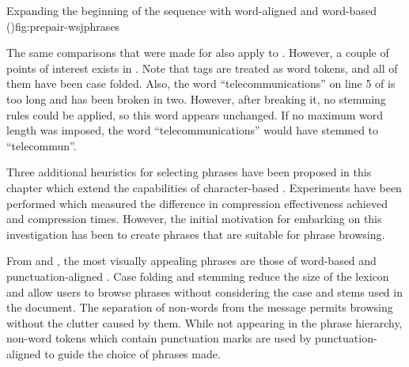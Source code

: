 {Expanding the beginning of the sequence with
word-aligned and word-based \repair (\wsja)}{fig:prepair-wsjphrases}

The same comparisons that were made for 
 also apply to 
.  However, a couple of 
points of interest exists in 
.  Note that \sgml
tags are treated as word tokens, and all of them have been
case folded.  Also, the word
``telecommunications'' on line 5 of 
 is too
long and has been broken in two.  However, after breaking
it, no stemming rules could be applied, so this word
appears unchanged.  If no maximum word length was imposed,
the word ``telecommunications'' would have stemmed to
``telecommun''.  


Three additional heuristics for selecting phrases
have been proposed in this chapter which extend the
capabilities of character-based \repair.
Experiments have been performed
which measured the difference in compression
effectiveness achieved and compression times.
However, the initial motivation
for embarking on this investigation has been to create
phrases that are suitable for phrase browsing.

From  and 
, the most visually
appealing phrases are those of word-based \repair
and punctuation-aligned \repair.  Case folding and
stemming reduce the size of the lexicon and allow
users to browse phrases without considering the
case and stems used in the document.  The separation
of non-words from the message permits browsing without
the clutter caused by them.  While not appearing 
in the phrase hierarchy, non-word tokens which contain
punctuation marks are used by 
punctuation-aligned \repair to guide the choice of 
phrases made.

